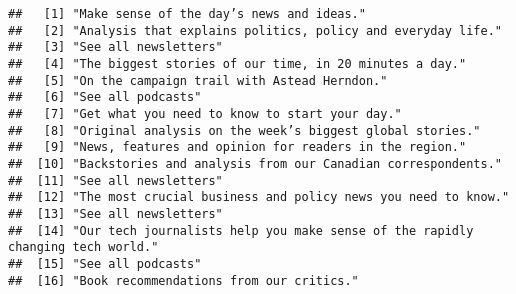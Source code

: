 \documentclass[
]{article}
\begin{document}
\begin{verbatim}
##   [1] "Make sense of the day’s news and ideas."                                                                                                                  
##   [2] "Analysis that explains politics, policy and everyday life."                                                                                               
##   [3] "See all newsletters"                                                                                                                                      
##   [4] "The biggest stories of our time, in 20 minutes a day."                                                                                                    
##   [5] "On the campaign trail with Astead Herndon."                                                                                                               
##   [6] "See all podcasts"                                                                                                                                         
##   [7] "Get what you need to know to start your day."                                                                                                             
##   [8] "Original analysis on the week’s biggest global stories."                                                                                                  
##   [9] "News, features and opinion for readers in the region."                                                                                                    
##  [10] "Backstories and analysis from our Canadian correspondents."                                                                                               
##  [11] "See all newsletters"                                                                                                                                      
##  [12] "The most crucial business and policy news you need to know."                                                                                              
##  [13] "See all newsletters"                                                                                                                                      
##  [14] "Our tech journalists help you make sense of the rapidly changing tech world."                                                                             
##  [15] "See all podcasts"                                                                                                                                         
##  [16] "Book recommendations from our critics."                                                                                                                   

\end{verbatim}
\end{document}
